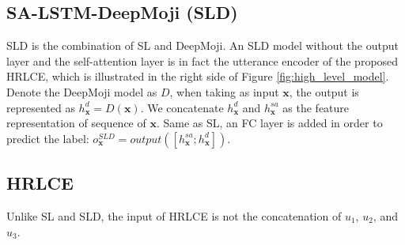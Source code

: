 \documentclass[11pt,a4paper]{article}
\begin{document}
\subsection{SA-LSTM-DeepMoji (SLD)} 
\label{sec:sld}
SLD is the combination of SL and DeepMoji. An SLD model without the output layer and the self-attention layer is in fact the utterance encoder of the proposed HRLCE, which is illustrated in the right side of Figure \ref{fig:high_level_model}. Denote the DeepMoji model as $D$, when taking as input $\bm{x}$, the output is represented as $h^{d}_{\bm{x}} = D(\bm{x})$. We concatenate $h^{d}_{\bm{x}}$ and $h^{sa}_{\bm{x}}$ as the feature representation of sequence of ${\bm{x}}$. Same as SL, an FC layer is added in order to predict the label: $o^{SLD}_{\bm{x}} = output([h^{sa}_{\bm{x}}; h^{d}_{\bm{x}}])$.


\begin{table}[]
\centering
\caption{Macro-F1 scores and its harmonic means of the four models}
\label{tab:results}
\end{table}

\subsection{HRLCE}
\label{sec:hrlce}
Unlike SL and SLD, the input of HRLCE is not the concatenation of $u_1$, $u_2$, and $u_3$. 
\end{document}
